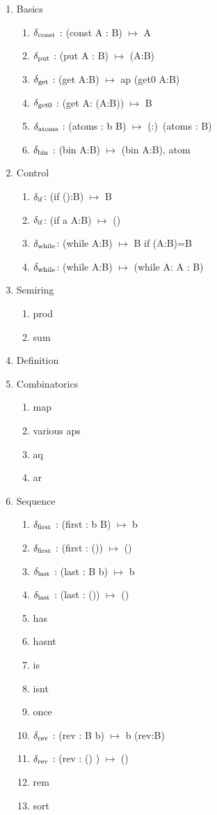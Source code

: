 \documentclass[11pt]{article}
\begin{document}
\begin{enumerate}
\item {Basics
\begin{enumerate}
\item{$\delta_{\rm const}$ : (const A : B) $\mapsto$ A}
\item{$\delta_{\rm put}$ : (put A : B) $\mapsto$ (A:B)}
\item{$\delta_{\rm get}$ : (get A:B) $\mapsto$ ap (get0 A:B)}  
\item{$\delta_{\rm get0}$ : (get A: (A:B)) $\mapsto$ B}
\item{$\delta_{\rm atoms}$ : (atoms : b B) $\mapsto$ (:)\ (atoms : B)}
\item{$\delta_{\rm bin}$ : (bin A:B) $\mapsto$ (bin A:B), atom} 
\end{enumerate}
}
\item {Control
\begin{enumerate}
\item{$\delta_{\rm if}$: (if ():B) $\mapsto$ B }
\item{$\delta_{\rm if}$: (if a A:B) $\mapsto$ () }
\item{$\delta_{\rm while}$: (while A:B) $\mapsto$ B if (A:B)=B }
\item{$\delta_{\rm while}$: (while A:B) $\mapsto$ (while A: A : B) }
\end{enumerate}
}
\item{Semiring
\begin{enumerate}
\item{prod}
\item{sum}
\end{enumerate}
}
\item{Definition}
\item{Combinatorics} 
\begin{enumerate}
\item{map}
\item{various aps}
\item{aq}
\item{ar}
\end{enumerate}
\item{Sequence 
\begin{enumerate}
\item{$\delta_{\rm first}$ : (first : b B) $\mapsto$ b}
\item{$\delta_{\rm first}$ : (first : ()) $\mapsto$ ()} 
\item{$\delta_{\rm last}$ : (last : B b) $\mapsto$ b} 
\item{$\delta_{\rm last}$ : (last : ()) $\mapsto$ ()} 
\item{has}
\item{hasnt}
\item{is}
\item{isnt} 
\item{once} 
\item{$\delta_{\rm rev}$ : (rev : B b) $\mapsto$ b (rev:B)} 
\item{$\delta_{\rm rev}$ : (rev : () ) $\mapsto$ ()}
\item{rem} 
\item{sort} 
\end{enumerate} 
}
\end{enumerate}
\end{document}
